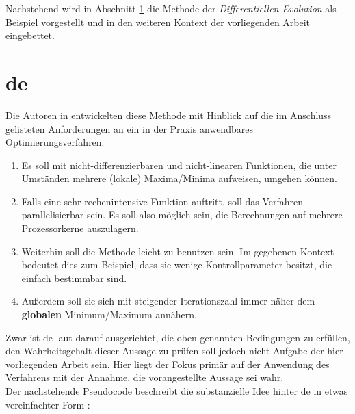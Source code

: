 		Nachstehend wird in Abschnitt \ref{sec:de} die Methode der 
		\textit{Differentiellen Evolution} als Beispiel vorgestellt und in den 
		weiteren Kontext der vorliegenden Arbeit eingebettet.
	

	\section{\gls{de}}
	\label{sec:de}

		Die Autoren in \cite{storn-price-de} entwickelten diese Methode mit Hinblick auf die im Anschluss gelisteten Anforderungen an ein in der Praxis anwendbares Optimierungsverfahren:
		\begin{enumerate}
			\item Es soll mit nicht-differenzierbaren und nicht-linearen 
			Funktionen, die unter Umständen mehrere (lokale) Maxima/Minima 
			aufweisen, umgehen können.
			\item Falls eine sehr rechenintensive Funktion auftritt, soll das 
			Verfahren parallelisierbar sein. Es soll also möglich sein, die 
			Berechnungen auf mehrere Prozessorkerne auszulagern.
			\item Weiterhin soll die Methode leicht zu benutzen sein. Im 
			gegebenen Kontext bedeutet dies zum Beispiel, dass sie wenige 
			Kontrollparameter besitzt, die einfach bestimmbar sind.
			\item Außerdem soll sie sich mit steigender Iterationszahl immer 
			näher dem \textbf{globalen} Minimum/Maximum annähern.
		\end{enumerate}
		Zwar ist \gls{de} laut \cite{storn-price-de} darauf ausgerichtet, die 
		oben genannten Bedingungen zu erfüllen, den Wahrheitsgehalt dieser 
		Aussage zu prüfen soll jedoch nicht Aufgabe der hier vorliegenden 
		Arbeit sein. Hier liegt der Fokus primär auf der Anwendung des 
		Verfahrens mit der Annahme, die vorangestellte Aussage sei wahr.\\
		
		Der nachstehende Pseudocode beschreibt die substanzielle Idee hinter \gls{de} in etwas vereinfachter Form \cite[S. 34]{storn-price-de-book}:\\
		
